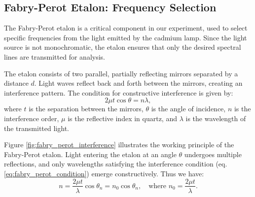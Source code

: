 \documentclass[a4paper,12pt]{article}
\begin{document}
\subsection{Fabry-Perot Etalon: Frequency Selection}
The Fabry-Perot etalon is a critical component in our experiment, used to select specific frequencies from the light emitted by the cadmium lamp. Since the light source is not monochromatic, the etalon ensures that only the desired spectral lines are transmitted for analysis.

The etalon consists of two parallel, partially reflecting mirrors separated by a distance $d$. Light waves reflect back and forth between the mirrors, creating an interference pattern. The condition for constructive interference is given by:
\begin{equation}
    2\mu t\cos \theta = n \lambda,
\label{eq:fabry_perot_condition}
\end{equation}
where $t$ is the separation between the mirrors, $\theta$ is the angle of incidence, $n$ is the interference order, $\mu$ is the reflective index in quartz, and $\lambda$ is the wavelength of the transmitted light. 


Figure \ref{fig:fabry_perot_interference} illustrates the working principle of the Fabry-Perot etalon. Light entering the etalon at an angle $\theta$ undergoes multiple reflections, and only wavelengths satisfying the interference condition (eq.\ref{eq:fabry_perot_condition}) emerge constructively. Thus we have:
\begin{equation}
    n = \frac{2\mu t}{\lambda} \cos \theta_n = n_0 \cos \theta_n, \quad \text{where } n_0 = \frac{2\mu t}{\lambda}.
\end{equation}
\end{document}
